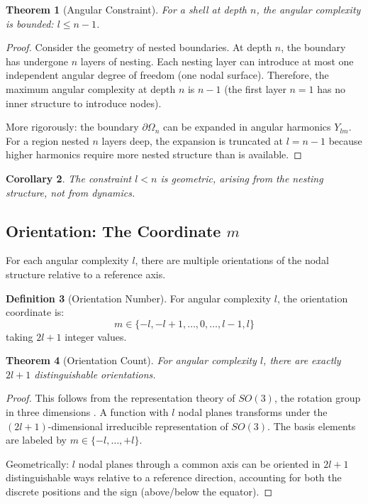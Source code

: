 \documentclass[twocolumn,10pt,a4paper]{article}
\newtheorem{theorem}{Theorem}[section]
\newtheorem{corollary}[theorem]{Corollary}
\theoremstyle{definition}
\newtheorem{definition}[theorem]{Definition}
\theoremstyle{remark}
\begin{document}
\begin{theorem}[Angular Constraint]
\label{thm:angular_constraint}
For a shell at depth $n$, the angular complexity is bounded: $l \leq n - 1$.
\end{theorem}

\begin{proof}
Consider the geometry of nested boundaries. At depth $n$, the boundary has undergone $n$ layers of nesting. Each nesting layer can introduce at most one independent angular degree of freedom (one nodal surface). Therefore, the maximum angular complexity at depth $n$ is $n - 1$ (the first layer $n = 1$ has no inner structure to introduce nodes).

More rigorously: the boundary $\partial\Omega_n$ can be expanded in angular harmonics $Y_{lm}$. For a region nested $n$ layers deep, the expansion is truncated at $l = n - 1$ because higher harmonics require more nested structure than is available.
\end{proof}

\begin{corollary}
The constraint $l < n$ is geometric, arising from the nesting structure, not from dynamics.
\end{corollary}

\subsection{Orientation: The Coordinate $m$}

For each angular complexity $l$, there are multiple orientations of the nodal structure relative to a reference axis.

\begin{definition}[Orientation Number]
For angular complexity $l$, the orientation coordinate is:
\begin{equation}
    m \in \{-l, -l+1, \ldots, 0, \ldots, l-1, l\}
\end{equation}
taking $2l + 1$ integer values.
\end{definition}

\begin{theorem}[Orientation Count]
For angular complexity $l$, there are exactly $2l + 1$ distinguishable orientations.
\end{theorem}

\begin{proof}
This follows from the representation theory of $SO(3)$, the rotation group in three dimensions \cite{wigner1959}. A function with $l$ nodal planes transforms under the $(2l+1)$-dimensional irreducible representation of $SO(3)$. The basis elements are labeled by $m \in \{-l, \ldots, +l\}$.

Geometrically: $l$ nodal planes through a common axis can be oriented in $2l + 1$ distinguishable ways relative to a reference direction, accounting for both the discrete positions and the sign (above/below the equator).
\end{proof}
\end{document}
